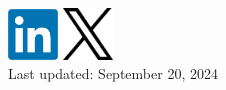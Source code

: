 \documentclass[A4,11pt]{article}
\begin{document}
\begin{minipage}[c]{0.4\textwidth}
    \href{https://www.linkedin.com/in/hafez-ghaemi-618b8287/}{\includegraphics[width=0.1\textwidth]{linkedin}}
    \href{https://x.com/hafezghm}{\includegraphics[width=0.1\textwidth]{x}}\\
    Last updated: September 20, 2024
\end{minipage}

\end{document}
